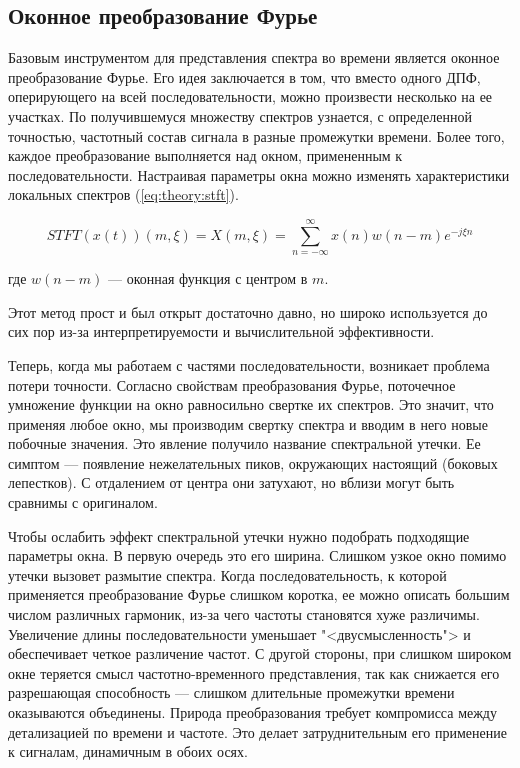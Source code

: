 \subsection{Оконное преобразование Фурье}

Базовым инструментом для представления спектра во времени является оконное преобразование Фурье. Его идея заключается в том, что вместо одного ДПФ, оперирующего на всей последовательности, можно произвести несколько на ее участках. По получившемуся множеству спектров узнается, с определенной точностью, частотный состав сигнала в разные промежутки времени. Более того, каждое преобразование выполняется над окном, примененным к последовательности. Настраивая параметры окна можно изменять характеристики локальных спектров (\autoref{eq:theory:stft}). \cite{stft_wiki}

\begin{equation}
  \label{eq:theory:stft}
  \mathit{STFT}(x(t))(m, \xi) = X(m, \xi) = \sum_{n=-\infty}^\infty x(n) w(n - m) e^{-j \xi n}
\end{equation}
\begin{explanation}
\item[где] $w(n - m)$ --- оконная функция с центром в $m$.
\end{explanation}

Этот метод прост и был открыт достаточно давно, но широко используется до сих пор из-за интерпретируемости и вычислительной эффективности.

Теперь, когда мы работаем с частями последовательности, возникает проблема потери точности. Согласно свойствам преобразования Фурье, поточечное умножение функции на окно равносильно свертке их спектров. Это значит, что применяя любое окно, мы производим свертку спектра и вводим в него новые побочные значения. Это явление получило название спектральной утечки. Ее симптом --- появление нежелательных пиков, окружающих настоящий (боковых лепестков). С отдалением от центра они затухают, но вблизи могут быть сравнимы с оригиналом.

Чтобы ослабить эффект спектральной утечки нужно подобрать подходящие параметры окна. В первую очередь это его ширина. Слишком узкое окно помимо утечки вызовет размытие спектра. Когда последовательность, к которой применяется преобразование Фурье слишком коротка, ее можно описать большим числом различных гармоник, из-за чего частоты становятся хуже различимы. Увеличение длины последовательности уменьшает "<двусмысленность"> и обеспечивает четкое различение частот. С другой стороны, при слишком широком окне теряется смысл частотно-временного представления, так как снижается его разрешающая способность --- слишком длительные промежутки времени оказываются объединены. Природа преобразования требует компромисса между детализацией по времени и частоте. Это делает затруднительным его применение к сигналам, динамичным в обоих осях.

